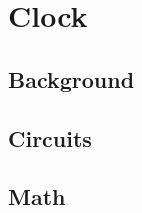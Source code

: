 \section{Clock} \label{sec:clock}

\subsection{Background} \label{sec:clock:background}

\subsection{Circuits} \label{sec:clock:circuits}

\subsection{Math} \label{sec:clock:math}
